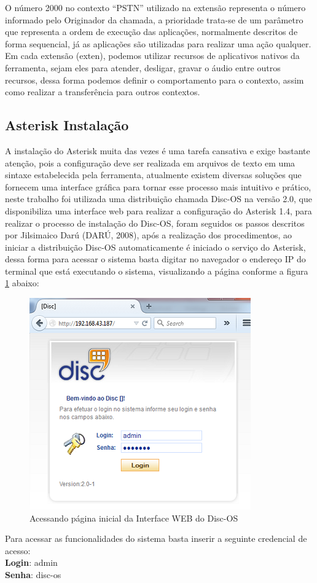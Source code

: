 O número 2000 no contexto “PSTN” utilizado na extensão representa o número informado pelo Originador da chamada, a prioridade trata-se de um parâmetro que representa a ordem de execução das aplicações, normalmente descritos de forma sequencial, já as aplicações são utilizadas para realizar uma ação qualquer. Em cada extensão (exten), podemos utilizar recursos de aplicativos nativos da ferramenta, sejam eles para atender, desligar, gravar o áudio entre outros recursos, dessa forma podemos definir o comportamento para o contexto, assim como realizar a transferência para outros contextos.


\subsection{Asterisk Instalação}

A instalação do Asterisk muita das vezes é uma tarefa cansativa e exige bastante atenção, pois a configuração deve ser realizada em arquivos de texto em uma sintaxe estabelecida pela ferramenta, atualmente existem diversas soluções que fornecem uma interface gráfica para tornar esse processo mais intuitivo e prático, neste trabalho foi utilizada uma distribuição chamada Disc-OS na versão 2.0, que disponibiliza uma interface web para realizar a configuração do Asterisk 1.4, para realizar o processo de instalação do Disc-OS, foram seguidos os passos descritos por Jilsimaico Darú (DARÚ, 2008), após a realização dos procedimentos, ao iniciar a distribuição Disc-OS automaticamente é iniciado o serviço do Asterisk, dessa forma para acessar o sistema basta digitar no navegador o endereço IP do terminal que está executando o sistema, visualizando a página conforme a figura \ref{figura:asteriskInterfaceWeb} abaixo:


\begin{figure}[!htb]
	\centering
	\caption{Acessando página inicial da Interface WEB do Disc-OS}	
	\label{figura:asteriskInterfaceWeb}
	\includegraphics{figuras/pagina_inicial_asterisk.png}
\end{figure}


Para acessar as funcionalidades do sistema basta inserir a seguinte credencial de acesso:\\
\textbf{Login}: admin\\
\textbf{Senha}: disc-os\\
